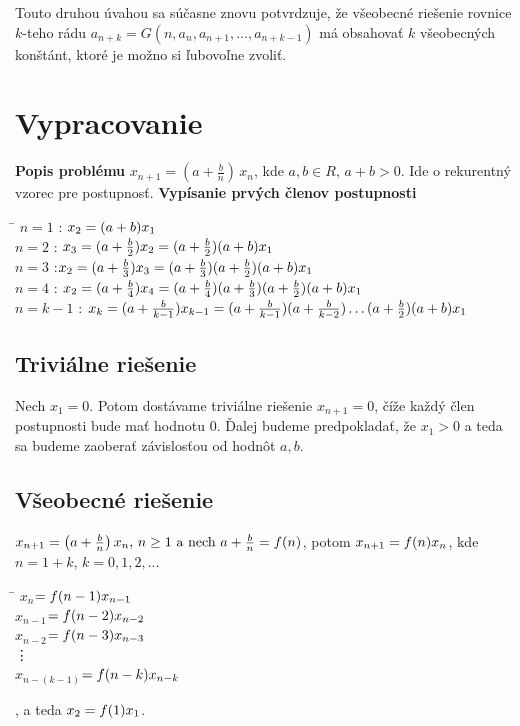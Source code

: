 \documentclass[a4paper,10pt]{article}
\theoremstyle{plain}
\theoremstyle{definition}
\begin{document}
Touto druhou úvahou sa súčasne znovu potvrdzuje, že všeobecné riešenie rovnice $k$-teho rádu 
$a_{n+k} = G(n, a_{n}, a_{n+1}, \ldots, a_{n+k-1})$ má obsahovať
$k$ všeobecných konštánt, ktoré je možno si ľubovoľne zvoliť.

\newpage
\section{Vypracovanie}
\textbf{Popis problému}\newline
$x_{n+1}=\left(a+{\frac{b}{n}}\right)\,x_{n}$, kde $a,b \in R,\, a+b >0$. Ide o rekurentný vzorec pre postupnosť.\newline\newline
\textbf{Vypísanie prvých členov postupnosti}
\begin{spacing}{1.4}
\begin{tabbing}
\hspace{2cm}\=\kill
 $n=1$ :\> $x_{2}= (a+b)\*x_{1}$\\ 
 $n=2$ :\>  $x_{3}=(a+\frac{b}{2})\*x_{2}=(a+\frac{b}{2})(a+b)\*x_{1}$ \\ 
 $n=3$ :\>$x_{2}=(a+\frac{b}{3})\*x_{3}=(a+\frac{b}{3})\*(a+\frac{b}{2})(a+b)\*x_{1}$\\
 $n=4$ :\> $x_{2}=(a+\frac{b}{4})\*x_{4}=(a+\frac{b}{4})\*(a+\frac{b}{3})\*(a+\frac{b}{2})
 (a+b)\*x_{1}$\\ 
  $n=k-1$ :\> $x_{k}=(a+\frac{b}{k-1})\*x_{k-1}=(a+\frac{b}{k-1})\*(a+\frac{b}{k-2})\ldots(a+\frac{b}{2})\*(a+b)\*x_{1}$
\end{tabbing} 
\end{spacing}
 

\subsection{Triviálne riešenie}
Nech $x_{1}=0$.\newline
 Potom dostávame triviálne riešenie $x_{n+1} = 0$, číže každý člen postupnosti bude mať hodnotu $0$. Ďalej budeme predpokladať, že $ x_{1} > 0 $ a teda sa budeme 
zaoberať závislosťou od hodnôt $ a,b $.

\subsection{Všeobecné riešenie}
$x_{n+1}=\left(a+{\frac{b}{n}}\right)\*x_{n} \text{, } n \geq 1 \text{ a nech } a + {\frac{b}{n}} = f(n)$, potom
$x_{n+1}=f(n)\*x_{n}   $, kde $ n = 1 + k $, $ k = 0,1,2,... $
\begin{spacing}{1.3}
\begin{tabbing}
\hspace{1.5cm}\=\kill
$ x_{n}$\>$=f(n-1)\*x_{n-1}    $\\
$ x_{n-1}$\>$=f(n-2)\*x_{n-2}    $\\
$ x_{n-2}$\>$=f(n-3)\*x_{n-3}    $\\
\>\vdots \\
$ x_{n-(k-1)}$\>$=f(n-k)\*x_{n-k}    $
\end{tabbing} 
\end{spacing}
\noindent, a teda $ x_{2} = f(1)\*x_{1} $. 
\end{document}

